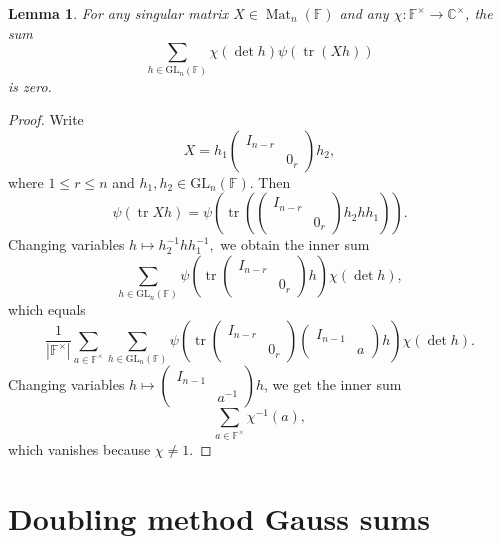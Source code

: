 \documentclass[12pt, reqno]{amsart}
\newtheorem{lemma}[theorem]{Lemma}
\theoremstyle{definition}
\theoremstyle{definition}
\theoremstyle{definition}
\newcommand{\cComplex}{\mathbb{C}}
\newcommand{\multiplicativegroup}[1]{#1^{\times}}
\newcommand{\sizeof}[1]{\left|#1\right|}
\newcommand{\fieldCharacter}{\psi}
\newcommand{\IdentityMatrix}[1]{I_{#1}}
\newcommand{\trace}{\operatorname{tr}}
\newcommand{\GL}{\mathrm{GL}}
\newcommand{\finiteField}{\mathbb{F}}
\newcommand{\squareMatrix}{\operatorname{Mat}}
\begin{document}
\begin{lemma}\label{lem:sum-vanishes-for-singular-matrices}
	For any singular matrix $X \in \squareMatrix_n\left(\finiteField\right)$ and any $\chi \colon \multiplicativegroup{\finiteField} \to \multiplicativegroup{\cComplex}$, the sum
	$$\sum_{h \in \GL_n\left(\finiteField\right)} \chi\left(\det h\right) \fieldCharacter\left(\trace\left(Xh\right)\right)$$
	is zero.
\end{lemma}
\begin{proof}
	Write $$X = h_1 \begin{pmatrix}
		\IdentityMatrix{n-r}\\
		& 0_r
	\end{pmatrix} h_2,$$
	where $1 \le r \le n$ and $h_1, h_2 \in \GL_n\left(\finiteField\right)$. Then
	$$\fieldCharacter\left(\trace Xh\right) = \fieldCharacter\left(\trace\left( \begin{pmatrix}
		\IdentityMatrix{n-r}\\
		& 0_r
	\end{pmatrix} h_2 h h_1\right)\right).$$
	Changing variables $h \mapsto h_2^{-1} h h_1^{-1},$
	we obtain the inner sum
	$$\sum_{h \in \GL_n\left(\finiteField\right)} \fieldCharacter\left(\trace \begin{pmatrix}
		\IdentityMatrix{n-r}\\
		& 0_r
	\end{pmatrix} h \right) \chi\left(\det h\right),$$
	which equals
	$$\frac{1}{\sizeof{\multiplicativegroup{\finiteField}}} \sum_{a \in \multiplicativegroup{\finiteField}} \sum_{h \in \GL_n\left(\finiteField\right)} \fieldCharacter\left(\trace \begin{pmatrix}
		\IdentityMatrix{n-r}\\
		& 0_r
	\end{pmatrix} \begin{pmatrix}
		\IdentityMatrix{n-1}\\
		& a
	\end{pmatrix} h \right) \chi\left(\det h\right).$$
	Changing variables $h \mapsto \left(\begin{smallmatrix}
		\IdentityMatrix{n-1}\\
		& a^{-1}
	\end{smallmatrix}\right) h$, we get the inner sum $$\sum_{a \in \multiplicativegroup{\finiteField}} \chi^{-1}\left(a\right),$$
	which vanishes because $\chi \ne 1$.
\end{proof}

\section{Doubling method Gauss sums}
\end{document}
